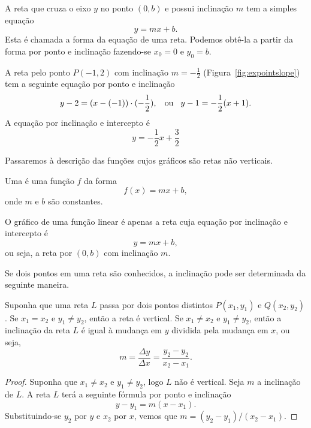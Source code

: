 A reta que cruza o eixo $y$ no ponto $(0,b)$ e possui inclinação $m$
tem a simples equação
\[
  y = mx + b.
\]
Esta é chamada a forma %
%
da equação de uma reta. Podemos obtê-la a partir da forma por
ponto e inclinação fazendo-se $x_0 = 0$ e $y_0 = b$.

\begin{example}
A reta pelo ponto $P(-1,2)$ com inclinação $m = - \frac{1}{2}$
(Figura~\ref{fig:expointslope}) tem a seguinte equação por
ponto e inclinação
\[
  y-2 = (x - (-1))\cdot(-\frac{1}{2}), \hspace{2ex} \text{ou}
  \hspace{2ex} y-1 = -\frac{1}{2}(x+1).
\]
A equação por inclinação e intercepto é
\[
  y = -\frac{1}{2}x + \frac{3}{2}
\]
\end{example}


Passaremos à descrição das funções cujos gráficos são retas não verticais.

\begin{defin}
Uma  é uma função $f$ da forma
\[
  f(x) = mx+b,
\]
onde $m$ e $b$ são constantes.
\end{defin}

O gráfico de uma função linear é apenas a reta cuja equação por
inclinação e intercepto é
\[
  y = mx+b,
\]
ou seja, a reta por $(0,b)$ com inclinação $m$.

Se dois pontos em uma reta são conhecidos, a inclinação pode ser
determinada da seguinte maneira.

\begin{theorem}
\label{theo:slope}
Suponha que uma reta $L$ passa por dois pontos distintos $P(x_1,y_1)$
e $Q(x_2,y_2)$. Se $x_1 = x_2$ e $y_1 \ne y_2$, então a reta é vertical.
Se $x_1 \ne x_2$ e $y_1 \ne y_2$, então a inclinação da reta $L$ é
igual à mudança em $y$ dividida pela mudança em $x$, ou seja,
\[
  m = \frac{\Delta y}{\Delta x} = \frac{y_2 - y_2}{x_2 - x_1}.
\]
\end{theorem}

\begin{proof}
Suponha que $x_1 \ne x_2$ e $y_1 \ne y_2$, logo $L$ não é vertical. Seja
$m$ a inclinação de $L$. A reta $L$ terá a seguinte fórmula por ponto e
inclinação
\[
  y - y_1 = m (x-x_1).
\]
Substituindo-se $y_2$ por $y$ e $x_2$ por $x$, vemos que
$m = (y_2 - y_1)/(x_2 - x_1)$.
\end{proof}


